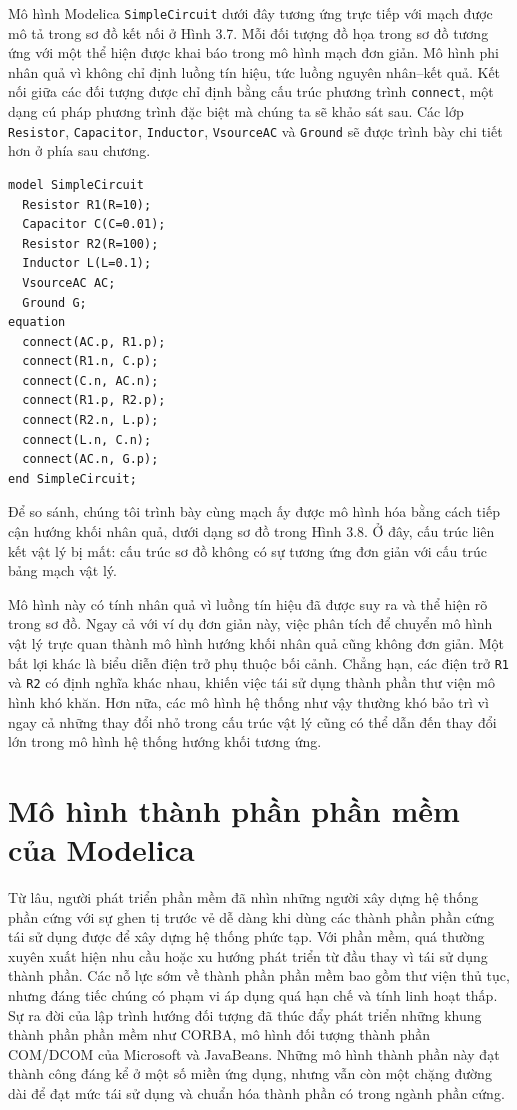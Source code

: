 Mô hình Modelica \texttt{SimpleCircuit} dưới đây tương ứng trực tiếp với mạch được mô tả trong sơ đồ kết nối ở Hình 3.7. Mỗi đối tượng đồ họa trong sơ đồ tương ứng với một thể hiện được khai báo trong mô hình mạch đơn giản. Mô hình phi nhân quả vì không chỉ định luồng tín hiệu, tức luồng nguyên nhân--kết quả. Kết nối giữa các đối tượng được chỉ định bằng cấu trúc phương trình \texttt{connect}, một dạng cú pháp phương trình đặc biệt mà chúng ta sẽ khảo sát sau. Các lớp \texttt{Resistor}, \texttt{Capacitor}, \texttt{Inductor}, \texttt{VsourceAC} và \texttt{Ground} sẽ được trình bày chi tiết hơn ở phía sau chương.
\begin{verbatim}
model SimpleCircuit
  Resistor R1(R=10);
  Capacitor C(C=0.01);
  Resistor R2(R=100);
  Inductor L(L=0.1);
  VsourceAC AC;
  Ground G;
equation
  connect(AC.p, R1.p);
  connect(R1.n, C.p);
  connect(C.n, AC.n);
  connect(R1.p, R2.p);
  connect(R2.n, L.p);
  connect(L.n, C.n);
  connect(AC.n, G.p);
end SimpleCircuit;
\end{verbatim}
Để so sánh, chúng tôi trình bày cùng mạch ấy được mô hình hóa bằng cách tiếp cận hướng khối nhân quả, dưới dạng sơ đồ trong Hình 3.8. Ở đây, cấu trúc liên kết vật lý bị mất: cấu trúc sơ đồ không có sự tương ứng đơn giản với cấu trúc bảng mạch vật lý.


Mô hình này có tính nhân quả vì luồng tín hiệu đã được suy ra và thể hiện rõ trong sơ đồ. Ngay cả với ví dụ đơn giản này, việc phân tích để chuyển mô hình vật lý trực quan thành mô hình hướng khối nhân quả cũng không đơn giản. Một bất lợi khác là biểu diễn điện trở phụ thuộc bối cảnh. Chẳng hạn, các điện trở \texttt{R1} và \texttt{R2} có định nghĩa khác nhau, khiến việc tái sử dụng thành phần thư viện mô hình khó khăn. Hơn nữa, các mô hình hệ thống như vậy thường khó bảo trì vì ngay cả những thay đổi nhỏ trong cấu trúc vật lý cũng có thể dẫn đến thay đổi lớn trong mô hình hệ thống hướng khối tương ứng.

\section{Mô hình thành phần phần mềm của Modelica}
Từ lâu, người phát triển phần mềm đã nhìn những người xây dựng hệ thống phần cứng với sự ghen tị trước vẻ dễ dàng khi dùng các thành phần phần cứng tái sử dụng được để xây dựng hệ thống phức tạp. Với phần mềm, quá thường xuyên xuất hiện nhu cầu hoặc xu hướng phát triển từ đầu thay vì tái sử dụng thành phần. Các nỗ lực sớm về thành phần phần mềm bao gồm thư viện thủ tục, nhưng đáng tiếc chúng có phạm vi áp dụng quá hạn chế và tính linh hoạt thấp. Sự ra đời của lập trình hướng đối tượng đã thúc đẩy phát triển những khung thành phần phần mềm như CORBA, mô hình đối tượng thành phần COM/DCOM của Microsoft và JavaBeans. Những mô hình thành phần này đạt thành công đáng kể ở một số miền ứng dụng, nhưng vẫn còn một chặng đường dài để đạt mức tái sử dụng và chuẩn hóa thành phần có trong ngành phần cứng.

